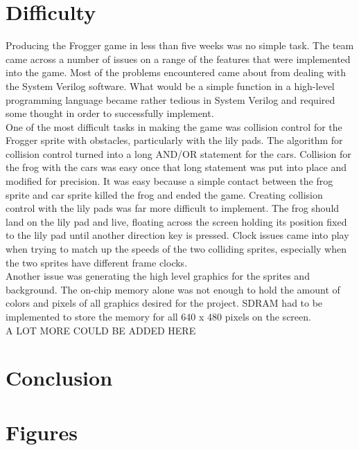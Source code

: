 \documentclass[journal, twocolumn, final,11pt,letterpaper]{IEEEtran}
\begin{document}
	
\section{ Difficulty}
Producing the Frogger game in less than five weeks was no simple task.  The team came across a number of issues on a range of the features that were implemented into the game.  Most of the problems encountered came about from dealing with the System Verilog software.  What would be a simple function in a high-level programming language became rather tedious in System Verilog and required some thought in order to successfully implement.  \\

One of the most difficult tasks in making the game was collision control for the Frogger sprite with obstacles, particularly with the lily pads.  The algorithm for collision control turned into a long AND/OR statement for the cars.  Collision for the frog with the cars was easy once that long statement was put into place and modified for precision.  It was easy because a simple contact between the frog sprite and car sprite killed the frog and ended the game.  Creating collision control with the lily pads was far more difficult to implement.  The frog should land on the lily pad and live, floating across the screen holding its position fixed to the lily pad until another direction key is pressed.  Clock issues came into play when trying to match up the speeds of the two colliding sprites, especially when the two sprites have different frame clocks.  \\

Another issue was generating the high level graphics for the sprites and background.  The on-chip memory alone was not enough to hold the amount of colors and pixels of all graphics desired for the project.  SDRAM had to be implemented to store the memory for all 640 x 480 pixels on the screen. \\

A LOT MORE COULD BE ADDED HERE\\

\section{Conclusion} 


\clearpage
\onecolumn
\section{Figures}
\end{document}
